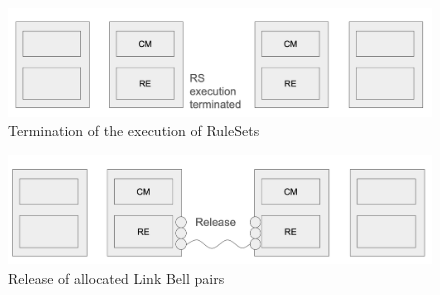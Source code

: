 \begin{figure}[H]
  \centerline{\includegraphics[width=\columnwidth]{images/ruleset_execution_terminated.png}}
  \caption{Termination of the execution of RuleSets}
\end{figure}

\begin{figure}[H]
  \centerline{\includegraphics[width=\columnwidth]{images/link_release.png}}
  \caption{Release of allocated Link Bell pairs}
\end{figure}


